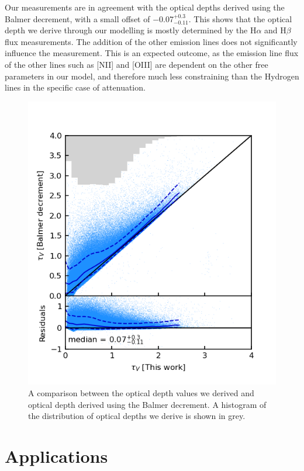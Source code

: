 \documentclass[fleqn,usenatbib]{mnras}
\begin{document}
Our measurements are in agreement with the optical depths derived using the Balmer decrement, with a small offset of $-$0.07$_{-0.11}^{+0.3}$. This shows that the optical depth we derive through our modelling is mostly determined by the H$\alpha$ and H$\beta$ flux measurements. The addition of the other emission lines does not significantly influence the measurement. This is an expected outcome, as the emission line flux of the other lines such as [NII] and [OIII] are dependent on the other free parameters in our model, and therefore much less constraining than the Hydrogen lines in the specific case of attenuation. 

\begin{figure}
    \centering
    \includegraphics[width=\columnwidth]{figures/fig5.png}
    \caption{A comparison between the optical depth values we derived and optical depth derived using the Balmer decrement. A histogram of the distribution of optical depths we derive is shown in grey.}
    \label{fig:model_dust_attenuation_vs_Balmer_decrement}
\end{figure}

\section{Applications}
\end{document}
